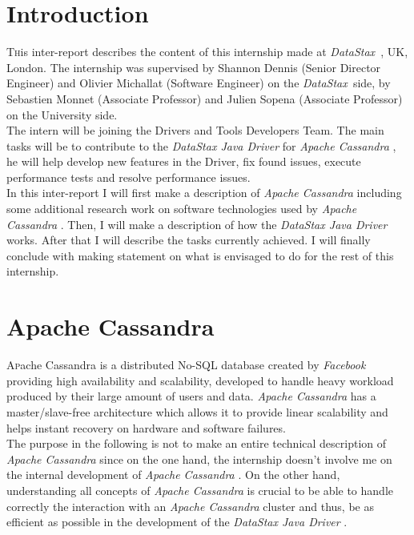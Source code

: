 \documentclass[a4paper]{report}
\newcommand{\ds}{\emph{\mbox{DataStax }}}
\newcommand{\djd}{\emph{DataStax Java Driver }}
\newcommand{\ca}{\emph{Apache Cassandra }}
\begin{document}


\chapter{Introduction}

\pagestyle{plain}
\lettrine[nindent=0em,lines=3]{T} his inter-report describes the content of this internship made at \ds, UK, London. The internship was supervised by Shannon Dennis (Senior Director Engineer) and Olivier Michallat (Software Engineer) on the \ds side, by Sebastien Monnet (Associate Professor) and Julien Sopena (Associate Professor) on the University side.\\
The intern will be joining the Drivers and Tools Developers Team. The main tasks will be to contribute to the \djd for \ca, he will help develop new features in the Driver, fix found issues, execute performance tests and resolve performance issues.\\
In this inter-report I will first make a description of \ca including some additional research work on software technologies used by \ca. Then, I will make a description of how the \djd works. After that I will describe the tasks currently achieved. I will finally conclude with making statement on what is envisaged to do for the rest of this internship.

\chapter{Apache Cassandra}
\lettrine[nindent=0em,lines=3]{A} pache Cassandra is a distributed No-SQL database created by \emph{Facebook} providing high availability and scalability, developed to handle heavy workload produced by their large amount of users and data. \ca has a master/slave-free architecture which allows it to provide linear scalability and helps instant recovery on hardware and software failures.\\
The purpose in the following is not to make an entire technical description of \ca since on the one hand, the internship doesn't involve me on the internal development of \ca. On the other hand, understanding all concepts of \ca is crucial to be able to handle correctly the interaction with an \ca cluster and thus, be as efficient as possible in the development of the \djd.
\end{document}
